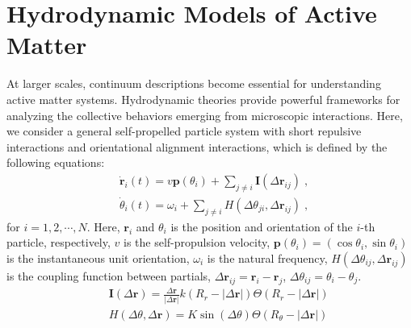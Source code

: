 \documentclass[a4paper, amsfonts, amssymb, amsmath, reprint, showkeys, showpacs, nofootinbib, twoside]{revtex4-2}
\begin{document}
\section{\label{sec:hydrodynamicModels} Hydrodynamic Models of Active Matter}
At larger scales, continuum descriptions become essential for understanding active matter systems. Hydrodynamic theories provide powerful frameworks for analyzing the collective behaviors emerging from microscopic interactions. Here, we consider a general self-propelled particle system with short repulsive interactions and orientational alignment interactions, which is defined by the following equations:
\begin{subequations}
    \begin{align}
        &\dot{\mathbf{r}}_i\left( t \right) =v\mathbf{p}\left( \theta _i \right) +\sum_{j\ne i}{\mathbf{I}\left( \Delta \mathbf{r}_{ij} \right) }\;,\\
        &\dot{\theta}_i\left( t \right) =\omega _i +\sum_{j\ne i}{H\left( \Delta \theta _{ji},\Delta \mathbf{r}_{ij} \right)}\;,
    \end{align}
\end{subequations}
for $i=1,2,\cdots,N$. Here, $\mathbf{r}_i$ and $\theta _i$ is the position and orientation of the $i$-th particle, respectively,
$v$ is the self-propulsion velocity, $\mathbf{p}\left( \theta _i \right)=\left( \cos \theta _i,\sin \theta _i \right)$ is the instantaneous unit orientation, $\omega _i$ is the natural frequency, $H\left( \Delta \theta _{ij},\Delta \mathbf{r}_{ij} \right)$ is the coupling function between partials, $\Delta \mathbf{r}_{ij}=\mathbf{r}_i-\mathbf{r}_j$, $\Delta \theta _{ij}=\theta _i-\theta _j$.
\begin{eqnarray}
    &&\mathbf{I}\left( \Delta \mathbf{r} \right) =\frac{\Delta \mathbf{r}}{\left| \Delta \mathbf{r} \right|}k\left( R_r-\left| \Delta \mathbf{r} \right| \right) \Theta \left( R_r-\left| \Delta \mathbf{r} \right| \right) \\
    &&H\left( \Delta \theta ,\Delta \mathbf{r} \right) =K\sin \left( \Delta \theta \right) \Theta \left( R_{\theta}-\left| \Delta \mathbf{r} \right| \right) 
\end{eqnarray}
\end{document}
